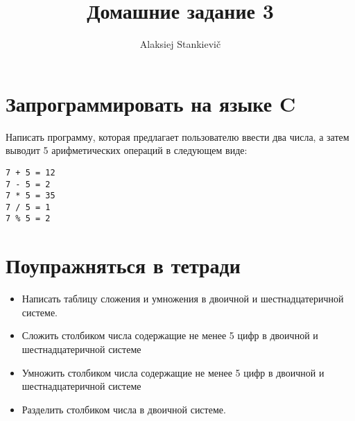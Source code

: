 \documentclass[12pt]{article}
\author{Alaksiej Stankievič}
\title{Домашние задание 3}
\begin{document}
 \section{Запрограммировать на языке C}
  Написать программу, которая предлагает пользователю ввести два числа, а затем выводит 5 арифметических операций в следующем виде:
  \begin{verbatim}
7 + 5 = 12
7 - 5 = 2
7 * 5 = 35
7 / 5 = 1
7 % 5 = 2
  \end{verbatim}
 \section{Поупражняться в тетради}
  \begin{itemize}
   \item Написать таблицу сложения и умножения в двоичной и шестнадцатеричной системе.
   \item Сложить столбиком числа содержащие не менее 5 цифр в двоичной и шестнадцатеричной системе
   \item Умножить столбиком числа содержащие не менее 5 цифр в двоичной и шестнадцатеричной системе
   \item Разделить столбиком числа в двоичной системе.
  \end{itemize}
\end{document}
